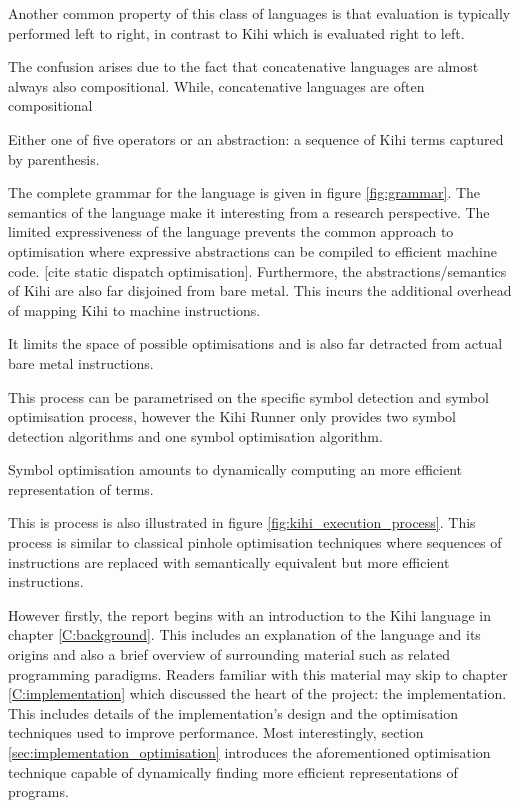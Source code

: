 Another common property of this class of languages is that evaluation
is typically performed left to right, in contrast to Kihi which is
evaluated right to left.

The confusion arises due to the fact that concatenative languages are
almost always also compositional.
While, concatenative languages are often compositional 



Either
one of five operators or an abstraction: a sequence of Kihi terms
captured by parenthesis. 

The complete grammar for the language is given
in figure \ref{fig:grammar}. The semantics of the language make it
interesting from a research perspective. The limited expressiveness of
the language prevents the common approach to optimisation where expressive
abstractions can be compiled to efficient machine code. [cite static
dispatch optimisation]. Furthermore, the abstractions/semantics of Kihi are
also far disjoined from bare metal. This incurs the additional overhead of
mapping Kihi to machine instructions.

It limits the space of possible
optimisations and is also far detracted from actual bare metal instructions.


This process can be parametrised on the specific symbol detection and symbol optimisation process, however the Kihi Runner only provides two symbol detection algorithms and one symbol optimisation algorithm.

Symbol optimisation amounts to dynamically computing an more efficient representation of terms. 

This is process is also illustrated in figure \ref{fig:kihi_execution_process}. This process is similar to classical pinhole optimisation techniques where sequences of instructions are replaced with semantically equivalent but more efficient instructions.






However firstly, the report begins with an introduction to the Kihi language in chapter \ref{C:background}. This includes an explanation of the language and its origins and also a brief overview of surrounding material such as related programming paradigms. Readers familiar with this material may skip to chapter \ref{C:implementation} which discussed the heart of the project: the implementation. This includes details of the implementation's design and the optimisation techniques used to improve performance. Most interestingly, section \ref{sec:implementation_optimisation} introduces the aforementioned optimisation technique capable of dynamically finding more efficient representations of programs.

